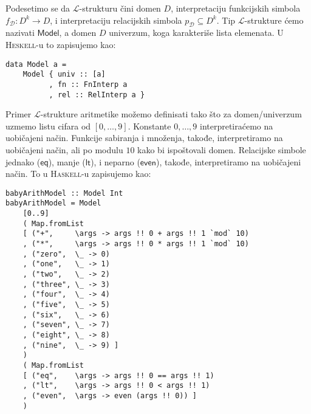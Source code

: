 \documentclass[a4paper,10pt]{article}
\theoremstyle{definition}
\begin{document}
Podesetimo se da $\mathcal{L}$-strukturu čini domen $D$, interpretaciju funkcijskih simbola $f_\mathcal{D} : D^k \to D$, i interpretaciju relacijskih simbola $p_\mathcal{D} \subseteq D^k$. Tip $\mathcal{L}$-strukture ćemo nazivati $\mathsf{Model}$, a domen $D$ univerzum, koga karakteriše lista elemenata. U \textsc{Heskell}-u to zapisujemo kao:
\begin{lstlisting}
data Model a =
    Model { univ :: [a]
          , fn :: FnInterp a
          , rel :: RelInterp a }
\end{lstlisting}
Primer $\mathcal{L}$-strukture aritmetike možemo definisati tako što za domen/univerzum uzmemo listu cifara od $[0, \ldots, 9]$. Konstante $0, \ldots, 9$ interpretiraćemo na uobičajeni način. Funkcije sabiranja i množenja, takođe, interpretiramo na uobičajeni način, ali po modulu $10$ kako bi ispoštovali domen. Relacijske simbole jednako ($\mathsf{eq}$), manje ($\mathsf{lt}$), i neparno ($\mathsf{even}$), takođe, interpretiramo na uobičajeni način. To u \textsc{Haskell}-u zapisujemo kao:
\begin{lstlisting}
babyArithModel :: Model Int                                                     
babyArithModel = Model                                                          
    [0..9]                                                                      
    ( Map.fromList                                                              
    [ ("+",     \args -> args !! 0 + args !! 1 `mod` 10)                        
    , ("*",     \args -> args !! 0 * args !! 1 `mod` 10)                        
    , ("zero",  \_ -> 0)                                                        
    , ("one",   \_ -> 1)                                                        
    , ("two",   \_ -> 2)                                                        
    , ("three", \_ -> 3)                                                        
    , ("four",  \_ -> 4)                                                        
    , ("five",  \_ -> 5)                                                        
    , ("six",   \_ -> 6)                                                        
    , ("seven", \_ -> 7)                                                        
    , ("eight", \_ -> 8)                                                        
    , ("nine",  \_ -> 9) ]
    )                                                                          
    ( Map.fromList                                                              
    [ ("eq",    \args -> args !! 0 == args !! 1)                                
    , ("lt",    \args -> args !! 0 < args !! 1)                                 
    , ("even",  \args -> even (args !! 0)) ] 
    )            
\end{lstlisting}
\end{document}
